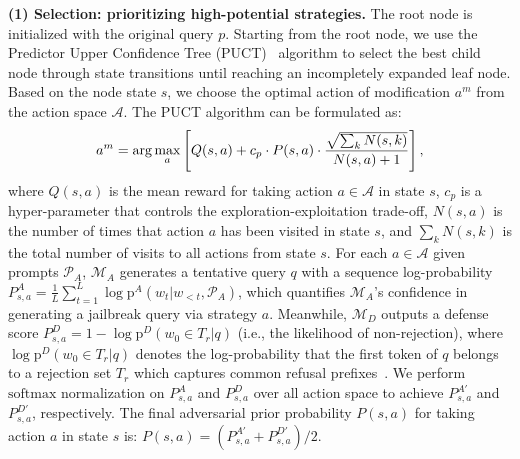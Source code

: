 \documentclass[11pt]{article}
\begin{document}
\textbf{(1) Selection: prioritizing high-potential strategies.} The root node is initialized with the original query $p$. Starting from the root node, we use the Predictor Upper Confidence Tree (PUCT)~\citep{PUCT} algorithm to select the best child node through state transitions until reaching an incompletely expanded leaf node. Based on the node state $s$, we choose the optimal action of modification $a^{m}$ from the action space $\mathcal{A}$. The PUCT algorithm can be formulated as:
\begin{equation}
\small
    a^{m} = \arg\max_{a} \left[ Q(s,a) + c_{p} \cdot P(s,a) \cdot \frac{\sqrt{\sum_{k}N(s,k)}}{N(s,a)+1} \right],
\end{equation}
where $Q(s,a)$ is the mean reward for taking action $a\in\mathcal{A}$ in state $s$, $c_{p}$ is a hyper-parameter that controls the exploration-exploitation trade-off, $N(s,a)$ is the number of times that action $a$ has been visited in state $s$, and $\sum_{k}N(s,k)$ is the total number of visits to all actions from state $s$. For each $a \in \mathcal{A}$ given prompts $\mathcal{P}_{A}$, $\mathcal{M}_A$ generates a tentative query $q$ with a sequence log-probability $P^A_{s,a} = \frac{1}{L}\sum_{t=1}^{L} \log\mathrm{p}^A(w_t|w_{<t}, \mathcal{P}_{A})$, which quantifies $\mathcal{M}_A$'s confidence in generating a jailbreak query via strategy $a$. Meanwhile, $\mathcal{M}_D$ outputs a defense score $P^D_{s,a} = 1 - \log\mathrm{p}^D(w_0 \in T_r|q)$ (i.e., the likelihood of non-rejection), where $\log\mathrm{p}^D(w_0 \in T_r|q)$ denotes the log-probability that the first token of $q$ belongs to a rejection set $T_r$  which captures common refusal prefixes~\citep{gptfuzzer,lin2024towards}. We perform $\mathrm{softmax}$ normalization on $P^A_{s,a}$ and $P^D_{s,a}$ over all action space to achieve $P^{A'}_{s,a}$ and $P^{D'}_{s,a}$, respectively. The final adversarial prior probability $P(s,a)$ for taking action $a$ in state $s$ is: $P(s,a) = \left(P^{A'}_{s,a} + P^{D'}_{s,a}\right)/2$.







\end{document}
